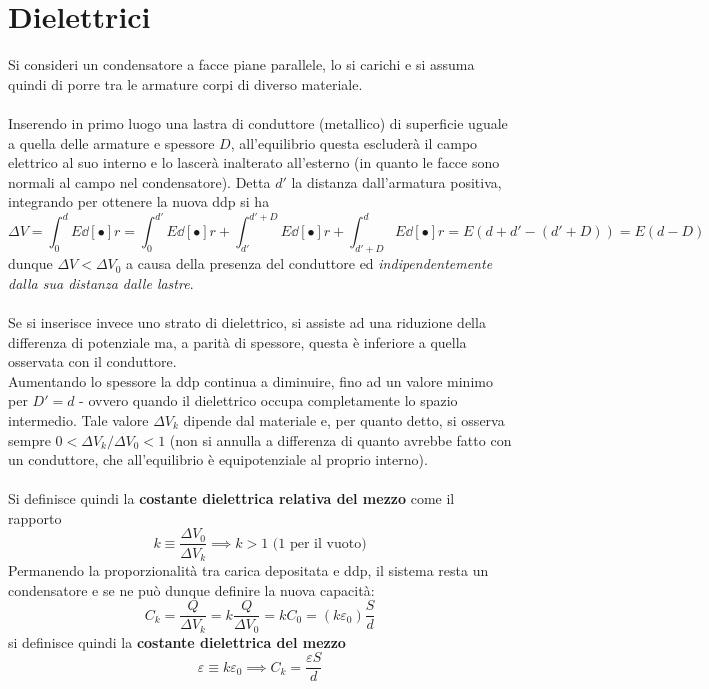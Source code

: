 \section{Dielettrici}
Si consideri un condensatore a facce piane parallele, lo si carichi e si assuma quindi di porre tra le armature corpi di diverso materiale.
\\~\\
Inserendo in primo luogo una lastra di conduttore (metallico) di superficie uguale a quella delle armature e spessore $D$, all'equilibrio questa escluderà il campo elettrico al suo interno e lo lascerà inalterato all'esterno (in quanto le facce sono normali al campo nel condensatore). Detta $d'$ la distanza dall'armatura positiva, integrando per ottenere la nuova ddp si ha
\[\Delta V = \int_0^d E \dd[•]{r} = \int_0^{d'} E \dd[•]{r} + \int_{d'}^{d'+D} E \dd[•]{r} + \int_{d'+D}^d E \dd[•]{r} = E(d+d' - (d'+D)) = E(d-D)\]
dunque $\Delta V < \Delta V_0$ a causa della presenza del conduttore ed \textit{indipendentemente dalla sua distanza dalle lastre}.
\\~\\
Se si inserisce invece uno strato di dielettrico, si assiste ad una riduzione della differenza di potenziale ma, a parità di spessore, questa è inferiore a quella osservata con il conduttore.
\\Aumentando lo spessore la ddp continua a diminuire, fino ad un valore minimo per $D' = d$ - ovvero quando il dielettrico occupa completamente lo spazio intermedio. Tale valore $\Delta V_k$ dipende dal materiale e, per quanto detto, si osserva sempre $0 < \Delta V_k / \Delta V_0 < 1$ (non si annulla a differenza di quanto avrebbe fatto con un conduttore, che all'equilibrio è equipotenziale al proprio interno).
\\~\\
Si definisce quindi la \textbf{costante dielettrica relativa del mezzo} come il rapporto
\[k \equiv \frac{\Delta V_0}{\Delta V_k} \implies k > 1 \textrm{ (1 per il vuoto)}\]
Permanendo la proporzionalità tra carica depositata e ddp, il sistema resta un condensatore e se ne può dunque definire la nuova capacità:
\[C_k = \frac{Q}{\Delta V_k} = k \frac{Q}{\Delta V_0} = k C_0 = (k \varepsilon_0) \frac{S}{d}\]
si definisce quindi la \textbf{costante dielettrica del mezzo} 
\[\varepsilon \equiv k \varepsilon_0 \implies C_k = \frac{\varepsilon S}{d}\]

